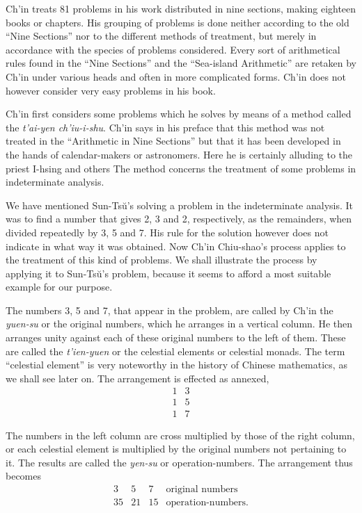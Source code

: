 \documentclass[11pt]{article}
\newcommand{\scanpage}[2]{\clearpage\setcounter{footnote}{0}\noindent{\footnotesize\color{gray}PDF page #1 · #2}\par\medskip}
\begin{document}
\scanpage{0079}{Chapter 11, printed page 65}
Ch'in treats 81 problems in his work distributed in nine sections, making eighteen books or chapters. His grouping of problems is done neither according to the old ``Nine Sections'' nor to the different methods of treatment, but merely in accordance with the species of problems considered. Every sort of arithmetical rules found in the ``Nine Sections'' and the ``Sea-island Arithmetic'' are retaken by Ch'in under various heads and often in more complicated forms. Ch'in does not however consider very easy problems in his book.

Ch'in first considers some problems which he solves by means of a method called the \emph{t'ai-yen ch'iu-i-shu}. Ch'in says in his preface that this method was not treated in the ``Arithmetic in Nine Sections'' but that it has been developed in the hands of calendar-makers or astronomers. Here he is certainly alluding to the priest I-hsing and others The method concerns the treatment of some problems in indeterminate analysis.

We have mentioned Sun-Tsŭ's solving a problem in the indeterminate analysis. It was to find a number that gives 2, 3 and 2, respectively, as the remainders, when divided repeatedly by 3, 5 and 7. His rule for the solution however does not indicate in what way it was obtained. Now Ch'in Chiu-shao's process applies to the treatment of this kind of problems. We shall illustrate the process by applying it to Sun-Tsŭ's problem, because it seems to afford a most suitable example for our purpose.

The numbers 3, 5 and 7, that appear in the problem, are called by Ch'in the \emph{yuen-su} or the original numbers, which he arranges in a vertical column. He then arranges unity against each of these original numbers to the left of them. These are called the \emph{t'ien-yuen} or the celestial elements or celestial monads. The term ``celestial element'' is very noteworthy in the history of Chinese mathematics, as we shall see later on. The arrangement is effected as annexed,
\[
\begin{array}{c|c}
1&3\\ \hline
1&5\\ \hline
1&7
\end{array}
\]

The numbers in the left column are cross multiplied by those of the right column, or each celestial element is multiplied by the original numbers not pertaining to it. The results are called the \emph{yen-su} or operation-numbers. The arrangement thus becomes
\[
\begin{array}{c|c|c|l}
3&5&7&\text{original numbers}\\ \hline
35&21&15&\text{operation-numbers.}
\end{array}
\]
\end{document}
